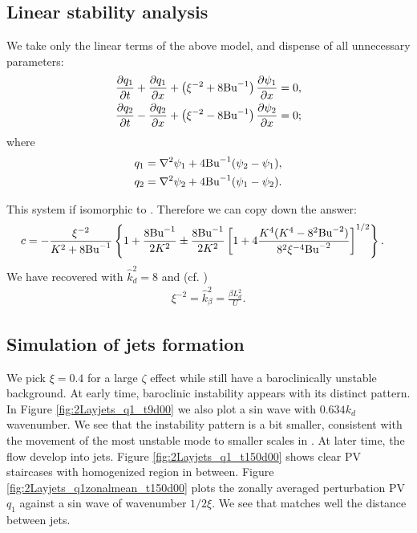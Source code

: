 \subsection{Linear stability analysis}
We take only the linear terms of the above model, and dispense of all unnecessary parameters:
\begin{align}
    &\frac{\partial q_1}{\partial t}+\frac{\partial q_1}{\partial x}+\left(\xi^{-2}+8\text{Bu}^{-1}\right)\frac{\partial\psi_1}{\partial x} = 0,\label{eq:2lay_sym_eq1_lin}\\
    &\frac{\partial q_2}{\partial t}-\frac{\partial q_2}{\partial x}+\left(\xi^{-2}-8\text{Bu}^{-1}\right)\frac{\partial\psi_2}{\partial x} = 0;\label{eq:2lay_sym_eq2_lin}
\end{align}
where
\begin{align}
    q_1 &= \nabla^2\psi_1 + 4\text{Bu}^{-1}(\psi_2-\psi_1),\label{eq:2lay_sym_pv1_lin}\\
    q_2 &= \nabla^2\psi_2 + 4\text{Bu}^{-1}(\psi_1-\psi_2).\label{eq:2lay_sym_pv2_lin}
\end{align}

This system if isomorphic to \cite[(9.107)]{Vallis_17}. Therefore we can copy down the answer:
\begin{align}
    c &= -\frac{\xi^{-2}}{K^2+8\text{Bu}^{-1}}\left\{ 1+\frac{8\text{Bu}^{-1}}{2K^2}\pm\frac{8\text{Bu}^{-1}}{2K^2}\left[1+4\frac{K^4(K^4-8^2\text{Bu}^{-2})}{8^2\xi^{-4}\text{Bu}^{-2}}\right]^{1/2} \right\}.
\end{align}
We have recovered \cite[(9.114)]{Vallis_17} with $\hat{k}_d^2 = 8$ and (cf. \cite[(9.115)]{Vallis_17})
\begin{align}
    \xi^{-2} = \hat{k}_\beta^2 = \frac{\beta L_d^2}{U}.
\end{align}

\subsection{Simulation of jets formation}
We pick $\xi = 0.4$ for a large $\zeta$ effect while still have a baroclinically unstable background. At early time, baroclinic instability appears with its distinct pattern. In Figure \ref{fig:2Layjets_q1_t9d00} we also plot a sin wave with $0.634k_d$ wavenumber. We see that the instability pattern is a bit smaller, consistent with the movement of the most unstable mode to smaller scales in \cite[Fig. 9.14]{Vallis_17}. At later time, the flow develop into jets. Figure \ref{fig:2Layjets_q1_t150d00} shows clear PV staircases with homogenized region in between. Figure \ref{fig:2Layjets_q1zonalmean_t150d00} plots the zonally averaged perturbation PV $q_1$ against a sin wave of wavenumber $1/2\xi$. We see that matches well the distance between jets.


